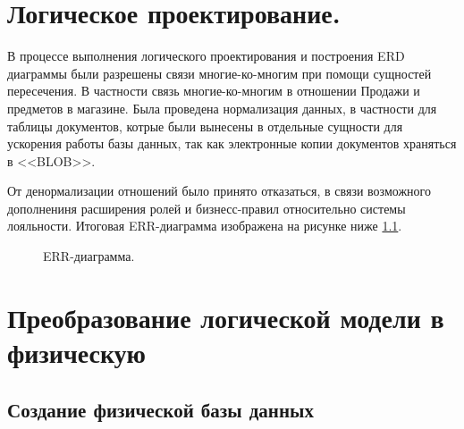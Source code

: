 \documentclass[14pt]{extreport}
\begin{document}
\chapter{Логическое проектирование.}
    В процессе выполнения логического проектирования и построения ERD диаграммы были разрешены связи многие-ко-многим при помощи %
    сущностей пересечения. В частности связь многие-ко-многим в отношении Продажи и предметов в магазине. Была проведена нормализация данных, в частности для%
    таблицы документов, котрые были вынесены в отдельные сущности для ускорения работы базы данных, так как электронные копии документов храняться в <<BLOB>>.

    От денормализации отношений было принято отказаться, в связи возможного дополнениня расширения ролей и бизнесс-правил относительно системы лояльности. 
    Итоговая ERR-диаграмма изображена на рисунке ниже \ref{ERR}.

    
    
    \begin{figure}[H]%
        \centering
        \caption{ERR-диаграмма.}
        \label{ERR} 
       \end{figure}


\chapter{Преобразование логической модели в физическую}

\section{Создание физической базы данных}
\end{document}
